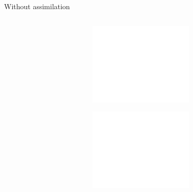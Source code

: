 \documentclass[aspectratio=169]{beamer} %
\begin{document}
\begin{frame}{Without assimilation}
    \vspace{-0.5cm}
    \begin{columns}
        \begin{column}{0.5\textwidth}
            \begin{figure}[t]
                \centering
            \end{figure}
        \end{column}
        \begin{column}{0.5\textwidth}
            \begin{figure}
                \centering
                \begin{subfigure}{\textwidth}
                    \centering
                    \includegraphics<2->[width=0.75\textwidth]{images/error_position_wo_assim.pdf}
                \end{subfigure}
                \begin{subfigure}{\textwidth}
                    \centering
                    \includegraphics<2->[width=0.75\textwidth]{images/error_vorticity_wo_assim.pdf}
                \end{subfigure}
            \end{figure}
        \end{column}
    \end{columns}
\end{frame}
\end{document}
